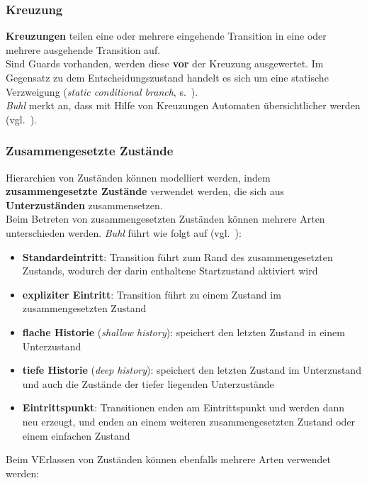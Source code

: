 \subsubsection*{Kreuzung}
\textbf{Kreuzungen} teilen eine oder mehrere eingehende Transition in eine oder mehrere ausgehende Transition auf.\\
Sind Guards vorhanden, werden diese \textbf{vor} der Kreuzung ausgewertet.
Im Gegensatz zu dem Entscheidungszustand handelt es sich um eine statische Verzweigung (\textit{static conditional branch}, s.~\cite[340]{Bal05}).\\
\textit{Buhl} merkt an, dass mit Hilfe von Kreuzungen Automaten übersichtlicher werden (vgl.~\cite[73]{Buh09}).


\subsubsection*{Zusammengesetzte Zustände}
Hierarchien von Zuständen können modelliert werden, indem \textbf{zusammengesetzte Zustände} verwendet werden, die sich aus \textbf{Unterzuständen} zusammensetzen.\\

\noindent
Beim Betreten von zusammengesetzten Zuständen können mehrere Arten unterschieden werden. \textit{Buhl} führt wie folgt auf (vgl.~\cite[73]{Buh09}):

\begin{itemize}
    \item \textbf{Standardeintritt}: Transition führt zum Rand des zusammengesetzten Zustands, wodurch der darin enthaltene Startzustand aktiviert wird
    \item \textbf{expliziter Eintritt}: Transition führt zu einem Zustand im zusammengesetzten Zustand
    \item \textbf{flache Historie} (\textit{shallow history}): speichert den letzten Zustand in einem Unterzustand
    \item \textbf{tiefe Historie} (\textit{deep history}): speichert den letzten Zustand im Unterzustand und auch die Zustände der tiefer liegenden Unterzustände
    \item \textbf{Eintrittspunkt}: Transitionen enden am Eintrittspunkt und werden dann neu erzeugt, und enden an einem weiteren zusammengesetzten Zustand oder einem einfachen Zustand
\end{itemize}

\noindent
Beim VErlassen von Zuständen können ebenfalls mehrere Arten verwendet werden:

